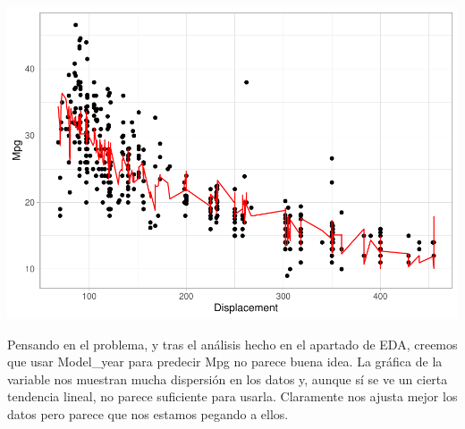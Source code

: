 \documentclass[
]{article}
\newenvironment{Shaded}{\begin{snugshade}}{\end{snugshade}}
\newcommand{\DataTypeTok}[1]{\textcolor[rgb]{0.13,0.29,0.53}{#1}}
\newcommand{\KeywordTok}[1]{\textcolor[rgb]{0.13,0.29,0.53}{\textbf{#1}}}
\newcommand{\NormalTok}[1]{#1}
\newcommand{\OperatorTok}[1]{\textcolor[rgb]{0.81,0.36,0.00}{\textbf{#1}}}
\newcommand{\StringTok}[1]{\textcolor[rgb]{0.31,0.60,0.02}{#1}}
\begin{document}
\begin{Shaded}
\end{Shaded}

\begin{center}\includegraphics{Regresion_files/figure-latex/unnamed-chunk-26-3} \end{center}

Pensando en el problema, y tras el análisis hecho en el apartado de EDA,
creemos que usar Model\_year para predecir Mpg no parece buena idea. La
gráfica de la variable nos muestran mucha dispersión en los datos y,
aunque sí se ve un cierta tendencia lineal, no parece suficiente para
usarla. Claramente nos ajusta mejor los datos pero parece que nos
estamos pegando a ellos.
\end{document}
